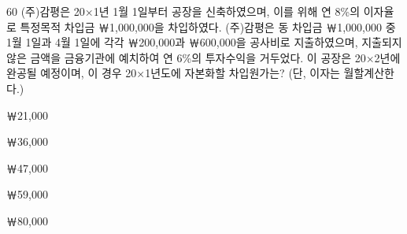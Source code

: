 \begin{question}{60}
(주)감평은 20×1년 1월 1일부터 공장을 신축하였으며, 이를 위해 연 8\%의 이자율로 특정목적 차입금 ￦1,000,000을 차입하였다. (주)감평은 동 차입금 ￦1,000,000 중 1월 1일과 4월 1일에 각각 ￦200,000과 ￦600,000을 공사비로 지출하였으며, 지출되지 않은 금액을 금융기관에 예치하여 연 6\%의 투자수익을 거두었다. 이 공장은 20×2년에 완공될 예정이며, 이 경우 20×1년도에 자본화할 차입원가는? (단, 이자는 월할계산한다.)
\begin{choices}
  \item ￦21,000
  \item ￦36,000
  \item ￦47,000
  \item ￦59,000
  \item ￦80,000
\end{choices}
\end{question}
